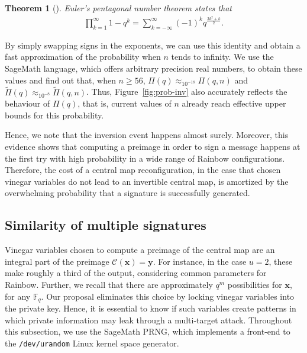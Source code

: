 \documentclass[12pt, a4paper, oneside]{memoir}
\newtheorem{theorem}{Theorem}[section]
\theoremstyle{definition}
\begin{document}
\begin{theorem}[{\cite[Theorem 14.3]{Apostol:2010}}]
  Euler's pentagonal number theorem states that
  \begin{align}
    \prod_{k = 1}^{\infty} 1 - q^{k} = \sum_{k = -\infty}^{\infty}
    {(-1)}^{k} q^{\frac{3k^{2} + k}{2}}.
  \end{align}
\end{theorem}

By simply swapping signs in the exponents, we can use this identity and obtain a fast approximation of the probability when $n$ tends to infinity. We use the SageMath language, which offers arbitrary precision real numbers, to obtain these values and find out that, when $n \geq 56$, $\Pi(q) \approx_{10^{-18}} \Pi(q, n)$ and $\widetilde{\Pi}(q) \approx_{10^{-8}} \widetilde{\Pi}(q, n)$. Thus, Figure~\ref{fig:prob-inv} also accurately reflects the behaviour of $\Pi(q)$, that is, current values of $n$ already reach effective upper bounds for this probability.

Hence, we note that the inversion event happens almost surely. Moreover, this evidence shows that computing a preimage in order to sign a message happens at the first try with high probability in a wide range of Rainbow configurations. Therefore, the cost of a central map reconfiguration, in the case that chosen vinegar variables do not lead to an invertible central map, is amortized by the overwhelming probability that a signature is successfully generated.

\subsection{Similarity of multiple signatures}\label{subsec:similar}

Vinegar variables chosen to compute a preimage of the central map are an integral part of the
preimage $\mathcal{C}(\mathbf{x}) = \mathbf{y}$. For instance, in the case $u = 2$, these make roughly a third of the output, considering common parameters for Rainbow. Further, we recall that there are approximately $q^{m}$ possibilities for $\mathbf{x}$, for any $\mathbb{F}_{q}$. Our proposal eliminates this choice by locking vinegar variables into the private key. Hence, it is essential to know if such variables create patterns in which private information may leak through a multi-target attack. Throughout this subsection, we use the SageMath PRNG, which implements a front-end to the \texttt{/dev/urandom} Linux kernel space generator.
\end{document}
